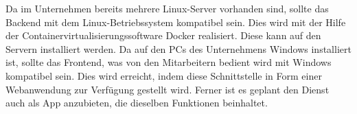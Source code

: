Da im Unternehmen bereits mehrere Linux-Server vorhanden sind, sollte das Backend mit dem Linux-Betriebssystem
kompatibel sein.
Dies wird mit der Hilfe der Containervirtualisierungssoftware Docker realisiert.
Diese kann auf den Servern installiert werden.
Da auf den PCs des Unternehmens Windows installiert ist, sollte das Frontend, was von den Mitarbeitern bedient wird
mit Windows kompatibel sein.
Dies wird erreicht, indem diese Schnittstelle in Form einer Webanwendung zur Verfügung gestellt wird.
Ferner ist es geplant den Dienst auch als App anzubieten, die dieselben Funktionen beinhaltet.
